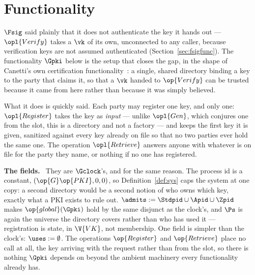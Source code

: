 \documentclass[10pt,oneside,openany]{book}
\newcommand{\heading}[1]{\medskip\par\noindent\textcolor{accent}{\textbf{#1.}}\ }
\theoremstyle{accentdef}
\theoremstyle{accentplain}
\begin{document}
\section{Functionality}\label{sec:pkifunc}

$\Fsig$ said plainly that it does not authenticate the key it hands out --- $\opl{Verify}$ takes a
$\vk$ of its own, unconnected to any caller, because verification keys are not assumed
authenticated (Section~\ref{sec:fsigfunc}). The functionality $\Gpki$ below is the setup that closes the gap, in the shape of
Canetti's own certification functionality~\cite{Canetti04}: a
single, shared directory binding a key to the party that claims it, so that a $\vk$ handed to
$\op{Verify}$ can be trusted because it came from here rather than because it was simply believed.

What it does is quickly said. Each party may register one key, and only one: $\opl{Register}$
takes the key as \emph{input} --- unlike $\opl{Gen}$, which conjures one from the slot, this is a
directory and not a factory --- and keeps the first key it is given, sanitized against every key
already on file so that no two parties ever hold the same one. The operation $\opl{Retrieve}$ answers anyone with
whatever is on file for the party they name, or nothing if no one has registered.

\heading{The fields} They are $\Gclock$'s, and for the same reason. The process id is a constant,
$(\op{G}\op{PKI},0,0)$, so Definition~\ref{def:sys} caps the system at one copy: a second
directory would be a second notion of who owns which key, exactly what a PKI exists to rule out.
$\admits := \Stdpid \cup \Apid \cup \Zpid$ makes $\op{global}(\Gpki)$ hold by the same disjunct as
the clock's, and $\Ps$ is again the universe the directory covers rather than who has used it ---
registration is state, in $\V{VK}$, not membership. One field is simpler than the clock's:
$\uses := \emptyset$. The operations $\op{Register}$ and $\op{Retrieve}$ place no call at all, the key arriving
with the request rather than from the slot, so there is nothing $\Gpki$ depends on beyond the
ambient machinery every functionality already has.
\end{document}
